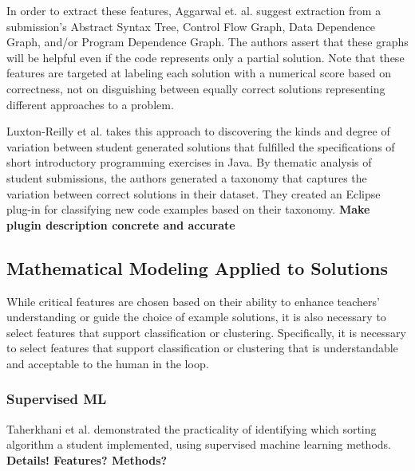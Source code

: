 \documentclass[12pt]{article}
\begin{document}
In order to extract these features, Aggarwal et. al. suggest extraction from a submission's Abstract Syntax Tree, Control Flow Graph, Data Dependence Graph, and/or Program Dependence Graph. The authors assert that these graphs will be helpful even if the code represents only a partial solution. Note that these features are targeted at labeling each solution with a numerical score based on correctness, not on disguishing between equally correct solutions representing different approaches to a problem.


%

Luxton-Reilly et al. \cite{Luxton13} takes this approach to discovering the kinds and degree of variation between student generated solutions that fulfilled the specifications of short introductory programming exercises in Java . By thematic analysis \cite{thematic06} of student submissions, the authors generated a taxonomy that captures the variation between correct solutions in their dataset. They created an Eclipse plug-in for classifying new code examples based on their taxonomy. \textbf{Make plugin description concrete and accurate}

\subsection{Mathematical Modeling Applied to Solutions}

While critical features are chosen based on their ability to enhance teachers' understanding or guide the choice of example solutions, it is also necessary to select features that support classification or clustering. Specifically, it is necessary to select features that support classification or clustering that is understandable and acceptable to the human in the loop.

\subsubsection{Supervised ML}

Taherkhani et al. \cite{taherkhani12} demonstrated the practicality of identifying which sorting algorithm a student implemented, using supervised machine learning methods. \textbf{Details! Features? Methods?}
\end{document}
